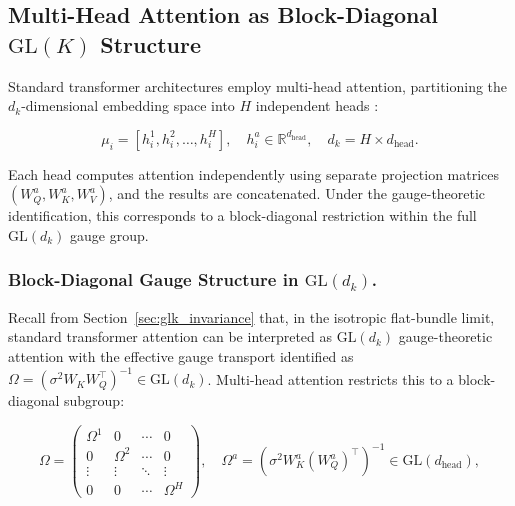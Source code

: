 \documentclass[twoside,11pt]{article}
\begin{document}
\begin{table}[p]
\label{tab:fep_nn_correspondence}
\end{table}


\subsection{Multi-Head Attention as Block-Diagonal $\mathrm{GL}(K)$ Structure}
\label{sec:multihead}

Standard transformer architectures employ multi-head attention, partitioning the $d_k$-dimensional embedding space into $H$ independent heads \citep{vaswani2017attention}:

\begin{equation}
\mu_i = [h_i^1, h_i^2, \ldots, h_i^H], \quad h_i^a \in \mathbb{R}^{d_{\text{head}}}, \quad d_k = H \times d_{\text{head}}.
\end{equation}

Each head computes attention independently using separate projection matrices $(W_Q^a, W_K^a, W_V^a)$, and the results are concatenated. Under the gauge-theoretic identification, this corresponds to a block-diagonal restriction within the full $\mathrm{GL}(d_k)$ gauge group.

\subsubsection{Block-Diagonal Gauge Structure in $\mathrm{GL}(d_k)$.}

Recall from Section~\ref{sec:glk_invariance} that, in the isotropic flat-bundle limit, standard transformer attention can be interpreted as $\mathrm{GL}(d_k)$ gauge-theoretic attention with the effective gauge transport identified as $\Omega = (\sigma^2 W_K W_Q^\top)^{-1} \in \mathrm{GL}(d_k)$. Multi-head attention restricts this to a block-diagonal subgroup:

\begin{equation}
\Omega = \begin{pmatrix}
\Omega^1 & 0 & \cdots & 0 \\
0 & \Omega^2 & \cdots & 0 \\
\vdots & \vdots & \ddots & \vdots \\
0 & 0 & \cdots & \Omega^H
\end{pmatrix}, \quad \Omega^a = (\sigma^2 W_K^a (W_Q^a)^\top)^{-1} \in \mathrm{GL}(d_{\text{head}}),
\end{equation}
\end{document}
